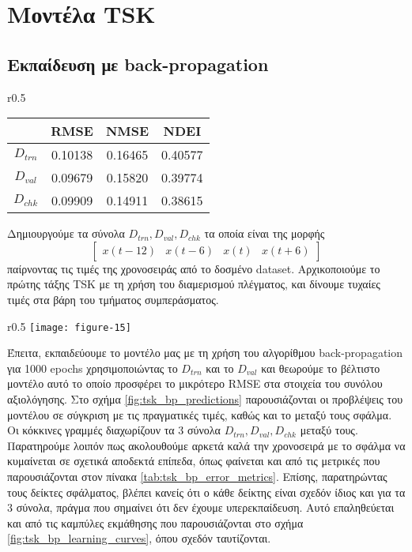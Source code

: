 \documentclass[11pt,a4paper,titlepage, oneside]{article}
\newlength\figureheight
\newlength\figurewidth
\begin{document}
	\section{Μοντέλα TSK}
		\subsection{Εκπαίδευση με back-propagation}
			\begin{wraptable}{r}{0.5\textwidth}
				\centering
				\begin{tabular}{c | c c c}
					 & \bfseries{RMSE} & \bfseries{NMSE} & \bfseries{NDEI} \\ \hline{}
					 $D_{trn}$ & 0.10138 & 0.16465 & 0.40577 \\ \hline
					 $D_{val}$ & 0.09679 & 0.15820 & 0.39774 \\ \hline
					 $D_{chk}$ & 0.09909 & 0.14911 & 0.38615 \\ 
				\end{tabular}
				\caption{Δείκτες σφαλμάτων για το μοντέλο first-order TSK (BP)}
				\label{tab:tsk_bp_error_metrics}
			\end{wraptable}
			Δημιουργούμε τα σύνολα $D_{trn}, D_{val}, D_{chk}$ τα οποία είναι της μορφής 
			$$ \begin{bmatrix} x(t-12) & x(t-6) & x(t) & x(t+6) \end{bmatrix} $$
			παίρνοντας τις τιμές της χρονοσειράς από το δοσμένο dataset. Αρχικοποιούμε το πρώτης τάξης TSK με τη χρήση του διαμερισμού πλέγματος, και δίνουμε τυχαίες τιμές στα βάρη του τμήματος συμπεράσματος.\\
						
			\begin{wrapfigure}{r}{0.5\textwidth}
				\vspace{-15pt}
			 	\setlength{}
				\setlength{}	
				\centering
				\texttt{[image: figure-15]}
				\caption{Καμπύλες εκμάθησης για το μοντέλο first-order TSK (BP)}
				\label{fig:tsk_bp_learning_curves}
			\end{wrapfigure}
			
			 Έπειτα, εκπαιδεύουμε το μοντέλο μας με τη χρήση του αλγορίθμου back-propagation για 1000 epochs χρησιμοποιώντας το $D_{trn}$ και το $D_{val}$ και θεωρούμε το βέλτιστο μοντέλο αυτό το οποίο προσφέρει το μικρότερο RMSE στα στοιχεία του συνόλου αξιολόγησης. Στο σχήμα \ref{fig:tsk_bp_predictions} παρουσιάζονται οι προβλέψεις του μοντέλου σε σύγκριση με τις πραγματικές τιμές, καθώς και το μεταξύ τους σφάλμα. Οι κόκκινες γραμμές διαχωρίζουν τα 3 σύνολα $D_{trn}, D_{val}, D_{chk}$ μεταξύ τους. Παρατηρούμε λοιπόν πως ακολουθούμε αρκετά καλά την χρονοσειρά με το σφάλμα να κυμαίνεται σε σχετικά αποδεκτά επίπεδα, όπως φαίνεται και από τις μετρικές που παρουσιάζονται στον πίνακα \ref{tab:tsk_bp_error_metrics}. Επίσης, παρατηρώντας τους δείκτες σφάλματος, βλέπει κανείς ότι ο κάθε δείκτης είναι σχεδόν ίδιος και για τα 3 σύνολα, πράγμα που σημαίνει ότι δεν έχουμε υπερεκπαίδευση. Αυτό επαληθεύεται και από τις καμπύλες εκμάθησης που παρουσιάζονται στο σχήμα \ref{fig:tsk_bp_learning_curves}, όπου σχεδόν ταυτίζονται.\\
						
\end{document}
